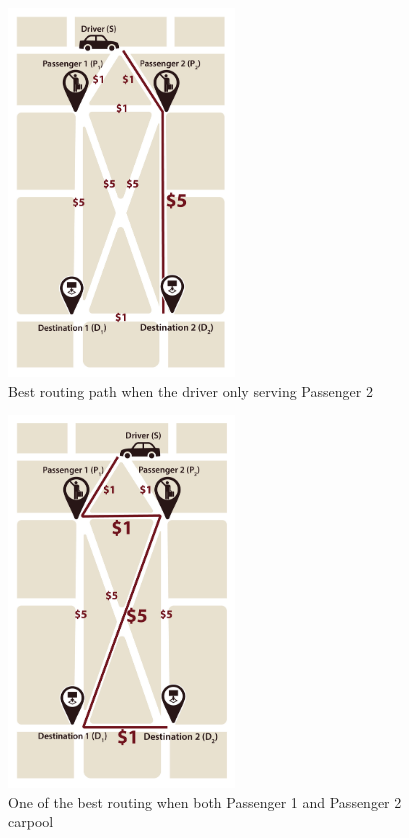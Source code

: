 \begin{figure}[htp]
  \centering
  \captionsetup{justification=centering}
  \includegraphics[width=6cm]{figures/mapV2_4.jpg}
  \caption{Best routing path when the driver only serving Passenger 2}
\end{figure}

\begin{figure}[htp]
  \centering
  \captionsetup{justification=centering}
  \includegraphics[width=6cm]{figures/mapV2_2.jpg}
  \caption{One of the best routing when both Passenger 1 and Passenger 2 carpool}
\end{figure}

